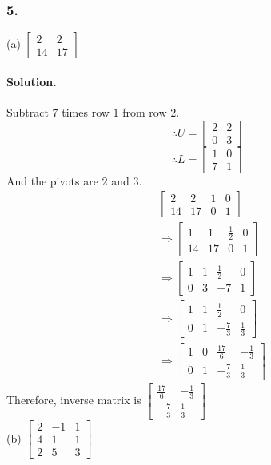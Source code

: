 \subsubsection{5.}
(a) $\begin{bmatrix}
    2&2\\14&17
\end{bmatrix}$
\paragraph*{Solution.}
Subtract 7 times row $1$ from row $2$.
$$\therefore U = \begin{bmatrix}
    2&2\\0&3
\end{bmatrix}$$
$$\therefore L = \begin{bmatrix}
    1&0\\7&1
\end{bmatrix}$$
And the pivots are $2$ and $3$.\\
\begin{align*}
    &\left[\begin{array}{cc|cc}
        2&2&1&0\\14&17&0&1
    \end{array}\right]\\
    &\Rightarrow\left[\begin{array}{cc|cc}
        1&1&\frac{1}{2}&0\\14&17&0&1
    \end{array}\right]\\
    &\Rightarrow\left[\begin{array}{cc|cc}
        1&1&\frac{1}{2}&0\\
        0&3&-7&1
    \end{array}\right]\\
    &\Rightarrow\left[\begin{array}{cc|cc}
        1&1&\frac{1}{2}&0\\
        0&1&-\frac{7}{3}&\frac{1}{3}
    \end{array}\right]\\
    &\Rightarrow\left[\begin{array}{cc|cc}
        1&0&\frac{17}{6}&-\frac{1}{3}\\
        0&1&-\frac{7}{3}&\frac{1}{3}
    \end{array}\right]
\end{align*}
Therefore, inverse matrix is $\begin{bmatrix}
    \frac{17}{6}&-\frac{1}{3}\\
    -\frac{7}{3}&\frac{1}{3}
\end{bmatrix}$\\
\newpage
(b) $\begin{bmatrix}
    2&-1&1\\4&1&1\\2&5&3
\end{bmatrix}$
